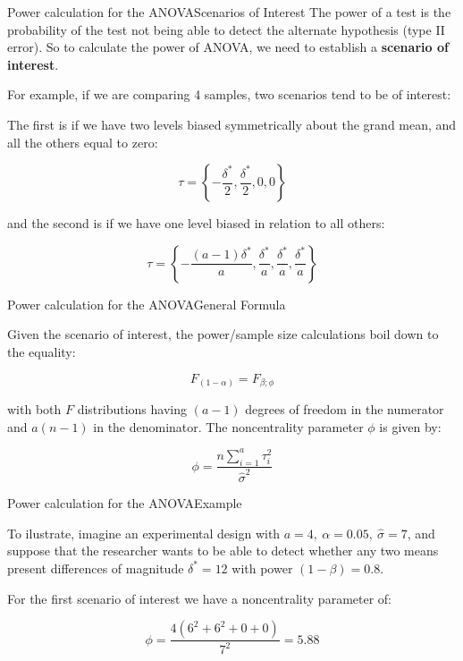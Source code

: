 \begin{frame}{Power calculation for the ANOVA}{Scenarios of Interest}
  The power of a test is the probability of the test not being able to
  detect the alternate hypothesis (type II error). So to calculate the
  power of ANOVA, we need to establish a {\bf scenario of interest}.\medskip 

  For example, if we are comparing 4 samples, two scenarios tend to be
  of interest:\bigskip

\noident The first is if we have two levels biased symmetrically about the
  grand mean, and all the others equal to zero:

$$ \tau = \left\{-\frac{\delta^*}{2}, \frac{\delta^*}{2}, 0, 0\right\}$$

\noindent and the second is if we have one level biased in relation to
all others:

$$ \tau = \left\{-\frac{(a-1)\delta^*}{a}, \frac{\delta^*}{a}, \frac{\delta^*}{a}, \frac{\delta^*}{a}\right\}$$
\end{frame}

\begin{frame}{Power calculation for the ANOVA}{General Formula}
  
Given the scenario of interest, the power/sample size calculations
boil down to the equality:

\begin{equation*}
F_{(1-\alpha)} = F_{\beta;\phi}
\end{equation*}

with both $F$ distributions having $(a-1)$ degrees of freedom in the
numerator and $a(n-1)$ in the denominator. The noncentrality parameter
$\phi$ is given by:

\begin{equation*}
\phi = \frac{n\sum\limits_{i=1}^{a}\tau_i^2}{\hat{\sigma}^2}
\end{equation*}
\end{frame}

\begin{frame}[fragile]{Power calculation for the ANOVA}{Example}

To ilustrate, imagine an experimental design with $a = 4,\ \alpha =
0.05,\ \hat{\sigma} = 7$, and suppose that the researcher wants to be
able to detect whether any two means present differences of magnitude
$\delta^* = 12$ with power $(1-\beta)=0.8$.\bigskip

For the first scenario of interest we have a noncentrality parameter of:

$$\phi = \frac{4\left(6^2+6^2+0+0\right)}{7^2} = 5.88$$
\end{frame}

